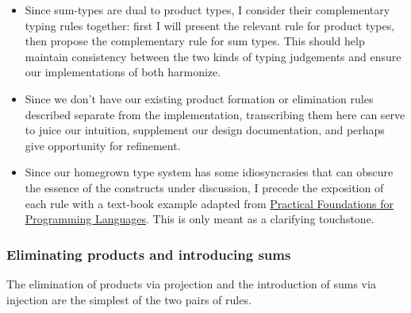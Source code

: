 \documentclass[11pt]{article}
\begin{document}
\begin{itemize}
\item Since sum-types are dual to product types, I consider their
complementary typing rules together: first I will present the relevant
rule for product types, then propose the complementary rule for sum
types. This should help maintain consistency between the two kinds of
typing judgements and ensure our implementations of both harmonize.
\item Since we don't have our existing product formation or elimination
rules described separate from the implementation, transcribing them
here can serve to juice our intuition, supplement our design
documentation, and perhaps give opportunity for refinement.
\item Since our homegrown type system has some idiosyncrasies that can
obscure the essence of the constructs under discussion, I precede the
exposition of each rule with a text-book example adapted from
\href{https://www.cs.cmu.edu/\~rwh/pfpl.html}{Practical Foundations for
Programming Languages}. This is only meant as a clarifying
touchstone.
\end{itemize}

\subsubsection{Eliminating products and introducing sums}
\label{sec:org5178260}
The elimination of products via projection and the introduction of sums
via injection are the simplest of the two pairs of rules.
\end{document}
